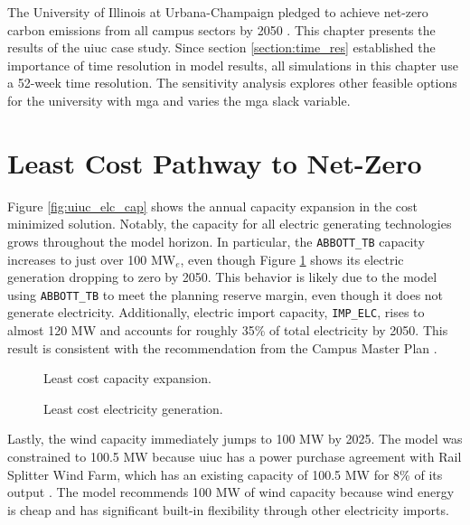 The University of Illinois at Urbana-Champaign pledged to achieve net-zero carbon
emissions from all campus sectors by 2050
\cite{institute_for_sustainability_energy_and_environment_illinois_2015}. This
chapter presents the results of the \gls{uiuc} case study. Since section
\ref{section:time_res} established the importance of time resolution in model results,
all simulations in this chapter use a 52-week time resolution. The sensitivity
analysis explores other feasible options for the university with \gls{mga} and
varies the \gls{mga} slack variable.

\section{Least Cost Pathway to Net-Zero}
Figure \ref{fig:uiuc_elc_cap} shows the annual capacity expansion in the cost
minimized solution. Notably, the capacity for all electric generating technologies
grows throughout the model horizon. In particular, the \texttt{ABBOTT\_TB} capacity
increases to just over 100 MW$_e$, even though Figure \ref{fig:uiuc_elc_gen}
shows its electric generation dropping to zero by 2050. This behavior is likely due to
the model using \texttt{ABBOTT\_TB} to meet the planning reserve margin, even
though it does not generate electricity. Additionally, electric import capacity,
\texttt{IMP\_ELC}, rises
to almost 120 MW and accounts for roughly 35\% of total electricity by 2050.
This result is consistent with the recommendation from the Campus Master Plan
\cite{affiliated_engineers_inc_utilities_2015}.

\begin{figure}[H]
  \begin{minipage}{0.48\textwidth}
    \captionsetup{type=figure}
    \centering
    \resizebox{\columnwidth}{!}{}
    \caption[]{Least cost capacity expansion.}
    \label{fig:uiuc_elc_cap}
  \end{minipage}
  \begin{minipage}{0.48\textwidth}
    \centering
    \resizebox{\columnwidth}{!}{}
    \caption[]{Least cost electricity generation.}
    \label{fig:uiuc_elc_gen}
  \end{minipage}
\end{figure}

Lastly, the wind capacity immediately jumps to 100 MW by 2025. The model was
constrained to 100.5 MW because \gls{uiuc} has a power purchase agreement with
Rail Splitter Wind Farm, which has an existing capacity of 100.5 MW for 8\% of
its output \cite{breitweiser_wind_2016}. The model recommends 100 MW of wind
capacity because wind energy is cheap and has significant built-in flexibility
through other electricity imports.


